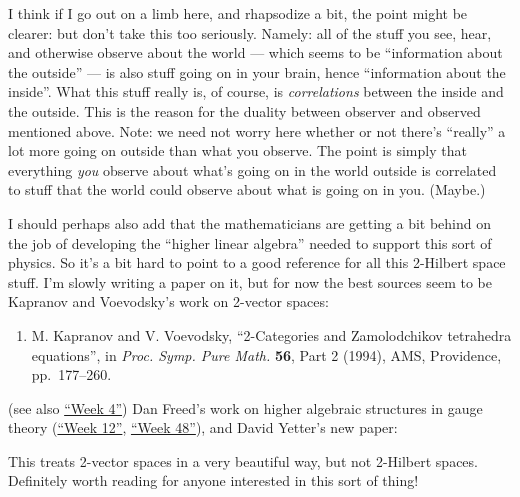 \documentclass{article}
\def\tightlist{}
\renewcommand{\texttt}[1]{%
  \begingroup
  \ttfamily
  \begingroup\lccode`~=`/\lowercase{\endgroup\def~}{/\discretionary{}{}{}}%
  \begingroup\lccode`~=`[\lowercase{\endgroup\def~}{[\discretionary{}{}{}}%
  \begingroup\lccode`~=`.\lowercase{\endgroup\def~}{.\discretionary{}{}{}}%
  \catcode`/=\active\catcode`[=\active\catcode`.=\active
  \scantokens{#1\noexpand}%
  \endgroup
}
\begin{document}
I think if I go out on a limb here, and rhapsodize a bit, the point
might be clearer: but don't take this too seriously. Namely: all of the
stuff you see, hear, and otherwise observe about the world --- which
seems to be ``information about the outside'' --- is also stuff going on
in your brain, hence ``information about the inside''. What this stuff
really is, of course, is \emph{correlations} between the inside and the
outside. This is the reason for the duality between observer and
observed mentioned above. Note: we need not worry here whether or not
there's ``really'' a lot more going on outside than what you observe.
The point is simply that everything \emph{you} observe about what's
going on in the world outside is correlated to stuff that the world
could observe about what is going on in you. (Maybe.)

I should perhaps also add that the mathematicians are getting a bit
behind on the job of developing the ``higher linear algebra'' needed to
support this sort of physics. So it's a bit hard to point to a good
reference for all this 2-Hilbert space stuff. I'm slowly writing a paper
on it, but for now the best sources seem to be Kapranov and Voevodsky's
work on 2-vector spaces:

\begin{enumerate}
\def\labelenumi{\arabic{enumi})}
\setcounter{enumi}{1}
\tightlist
\item
  M. Kapranov and V. Voevodsky, ``2-Categories and Zamolodchikov
  tetrahedra equations'', in \emph{Proc. Symp. Pure Math.} \textbf{56},
  Part 2 (1994), AMS, Providence, pp.~177--260.
\end{enumerate}

(see also \protect\hyperlink{week4}{``Week 4''}) Dan Freed's work on
higher algebraic structures in gauge theory
(\protect\hyperlink{week12}{``Week 12''},
\protect\hyperlink{week48}{``Week 48''}), and David Yetter's new paper:


This treats 2-vector spaces in a very beautiful way, but not 2-Hilbert
spaces. Definitely worth reading for anyone interested in this sort of
thing!
\end{document}
